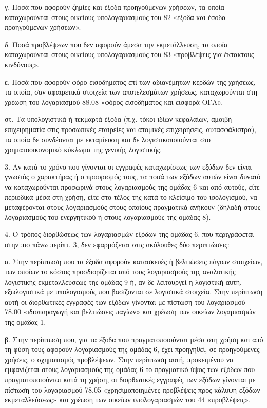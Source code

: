 \documentclass[A4,10pt,greek]{book}
\begin{document}
γ. Ποσά που αφορούν ζημίες και έξοδα προηγούμενων χρήσεων, τα οποία καταχωρούνται στους οικείους υπολογαριασμούς του 82 «έξοδα και έσοδα προηγούμενων χρήσεων».

δ. Ποσά προβλέψεων που δεν αφορούν άμεσα την εκμετάλλευση, τα οποία καταχωρούνται στους οικείους υπολογαριασμούς του 83 «προβλέψεις για έκτακτους κινδύνους».

ε. Ποσά που αφορούν φόρο εισοδήματος επί των αδιανέμητων κερδών της χρήσεως, τα οποία, σαν αφαιρετικά στοιχεία των αποτελεσμάτων χρήσεως, καταχωρούνται στη χρέωση του λογαριασμού 88.08 «φόρος εισοδήματος και εισφορά ΟΓΑ».

στ. Τα υπολογιστικά ή τεκμαρτά έξοδα (π.χ. τόκοι ιδίων κεφαλαίων, αμοιβή επιχειρηματία στις προσωπικές εταιρείες και ατομικές επιχειρήσεις, αυτασφάλιστρα), τα οποία δε συνδέονται με εκταμίευση και δε λογιστικοποιούνται στο χρηματοοικονομικό κύκλωμα της γενικής λογιστικής.

3. Αν κατά το χρόνο που γίνονται οι εγγραφές καταχωρίσεως των εξόδων δεν είναι γνωστός ο χαρακτήρας ή ο προορισμός τους, τα ποσά των εξόδων αυτών είναι δυνατό να καταχωρούνται προσωρινά στους λογαριασμούς της ομάδας 6 και από αυτούς, είτε περιοδικά μέσα στη χρήση, είτε στο τέλος της κατά το κλείσιμο του ισολογισμού, να μεταφέρονται στους λογαριασμούς στους οποίους πραγματικά ανήκουν (δηλαδή στους λογαριασμούς του ενεργητικού ή στους λογαριασμούς της ομάδας 8).

4. Ο τρόπος διορθώσεως των λογαριασμών εξόδων της ομάδας 6, που περιγράφεται στην πιο πάνω περίπτ. 3, δεν εφαρμόζεται στις ακόλουθες δύο περιπτώσεις:

α. Στην περίπτωση που τα έξοδα αφορούν κατασκευές ή βελτιώσεις πάγιων στοιχείων, των οποίων το κόστος προσδιορίζεται από τους λογαριασμούς της αναλυτικής λογιστικής εκμεταλλεύσεως της ομάδας 9 ή, αν δε λειτουργεί η λογιστική αυτή, εξωλογιστικά με υπολογισμούς που βασίζονται σε λογιστικά στοιχεία. Στην περίπτωση αυτή οι διορθωτικές εγγραφές των εξόδων γίνονται με πίστωση του λογαριασμού 78.00 «ιδιοπαραγωγή και βελτιώσεις παγίων» και χρέωση των οικείων λογαριασμών της ομάδας 1.

β. Στην περίπτωση που, για τα έξοδα που πραγματοποιούνται μέσα στη χρήση και από τη φύση τους αφορούν λογαριασμούς της ομάδας 6, έχει προηγηθεί, σε προηγούμενες χρήσεις, ο σχηματισμός προβλέψεων. Στην περίπτωση αυτή, προκειμένου να εμφανίζεται στους λογαριασμούς της ομάδας 6 το πραγματικό ύψος των εξόδων που πραγματοποιούνται κατά τη χρήση, οι διορθωτικές εγγραφές των εξόδων γίνονται με πίστωση του λογαριασμού 78.05 «χρησιμοποιημένες προβλέψεις προς κάλυψη εξόδων εκμεταλλεύσεως» και χρέωση των οικείων υπολογαριασμών του 44 «προβλέψεις».
\end{document}
